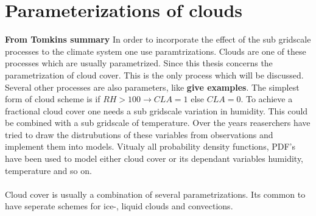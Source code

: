 \section{Parameterizations of clouds} \label{sec:param_clouds}
\textbf{From Tomkins summary}
In order to incorporate the effect of the sub gridscale processes to the climate system one use paramtrizations. Clouds are one of these processes which are usually parametrized. Since this thesis concerns the parametrization of cloud cover. This is the only process which will be discussed. Several other processes are also parameters, like \textbf{give examples}. The simplest form of cloud scheme is if $RH > 100 \rightarrow CLA = 1$ else $CLA = 0$. To achieve a fractional cloud cover one needs a sub gridscale variation in humidity. This could be combined with a sub gridscale of temperature. Over the years reaserchers have tried to draw the distrubutions of these variables from observations and implement them into models. Vitualy all probability density functions, PDF's have been used to model either cloud cover or its dependant variables humidity, temperature and so on.  
\\ \\
Cloud cover is usually a combination of several parametrizations. Its common to have seperate schemes for ice-, liquid clouds and convections.
\\ \\ 
